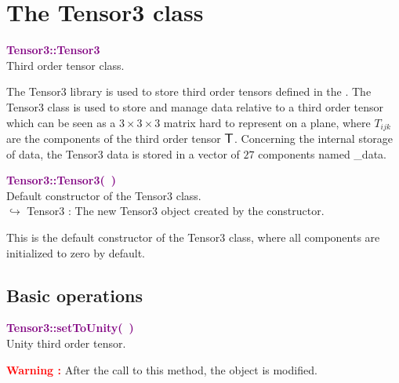 \section{The Tensor3 class}

\textcolor{purple}{\textbf{Tensor3::Tensor3}}\label{Tensor3::Tensor3}\\
Third order tensor class.

The Tensor3 library is used to store third order tensors defined in the \DynELA.
The Tensor3 class is used to store and manage data relative to a third order tensor which can be seen as a $3\times3\times3$ matrix hard to represent on a plane,
where $T_{ijk}$ are the components of the third order tensor $\mbox{\large\ensuremath{\mathsf{T}}}$.
Concerning the internal storage of data, the Tensor3 data is stored in a vector of $27$ components named \textsf{\_data}.



\textcolor{purple}{\textbf{Tensor3::Tensor3(~)}}\label{Tensor3::Tensor3()}\\
Default constructor of the Tensor3 class.\\ \hspace*{10mm}$\hookrightarrow$ Tensor3 : The new Tensor3 object created by the constructor.

This is the default constructor of the Tensor3 class, where all components are initialized to zero by default.

\subsection{Basic operations}

\textcolor{purple}{\textbf{Tensor3::setToUnity(~)}}\label{Tensor3::setToUnity()}\\
Unity third order tensor.

\hspace*{10mm}\textcolor{red}{\textbf{Warning :}} After the call to this method, the object is modified.

